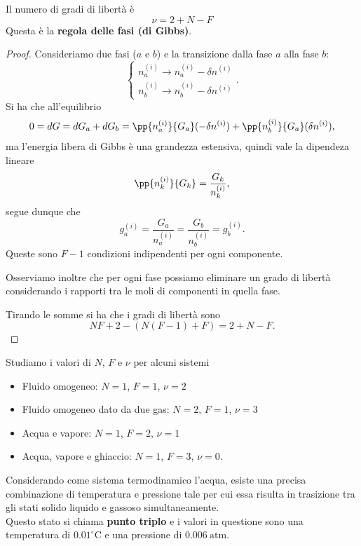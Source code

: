 \begin{proposition}\label{RegolaFasiGibbs}
Il numero di gradi di libert\`a \`e
\[\boxed{\nu=2+N-F}\]
Questa \`e la \textbf{regola delle fasi (di Gibbs)}.
\end{proposition}
\begin{proof}
Consideriamo due fasi ($a$ e $b$) e la transizione dalla fase $a$ alla fase $b$:
\[\begin{cases}
n_a^{(i)}\to n_a^{(i)}-\delta n^{(i)}\\
n_b^{(i)}\to n_b^{(i)}-\delta n^{(i)}
\end{cases}.\]
Si ha che all'equilibrio
\[0=dG=dG_a+dG_b=\pp {n_a^{(i)}}{G_a}(-\delta n^{(i)})+\pp {n_b^{(i)}}{G_a}(\delta n^{(i)}),\]
ma l'energia libera di Gibbs \`e una grandezza estensiva, quindi vale la dipendeza lineare
\[\pp {n_k^{(i)}}{G_k}=\frac{G_k}{n_k^{(i)}},\]
segue dunque che
\[g_a^{(i)}=\frac{G_a}{n_a^{(i)}}=\frac{G_b}{n_b^{(i)}}=g_b^{(i)}.\]
Queste sono $F-1$ condizioni indipendenti per ogni componente.
\bigskip

\noindent Osserviamo inoltre che per ogni fase possiamo eliminare un grado di libert\`a considerando i rapporti tra le moli di componenti in quella fase.\bigskip

\noindent Tirando le somme si ha che i gradi di libert\`a sono
\[NF+2-(N(F-1)+F)=2+N-F.\]
\end{proof}



\begin{example}
Studiamo i valori di $N$, $F$ e $\nu$ per alcuni sistemi
\begin{itemize}
\item Fluido omogeneo: $N=1$, $F=1$, $\nu=2$
\item Fluido omogeneo dato da due gas: $N=2$, $F=1$, $\nu=3$
\item Acqua e vapore: $N=1$, $F=2$, $\nu=1$
\item Acqua, vapore e ghiaccio: $N=1$, $F=3$, $\nu=0$.
\end{itemize}
\end{example}

\begin{definition}
Considerando come sistema termodinamico l'acqua, esiste una precisa combinazione di temperatura e pressione tale per cui essa risulta in trasizione tra gli stati solido liquido e gassoso simultaneamente.\\
Questo stato si chiama \textbf{punto triplo} e i valori in questione sono una temperatura di $0.01 ^\circ \mathrm{C}$ e una pressione di $0.006\ \mathrm{atm}$.
\end{definition}

